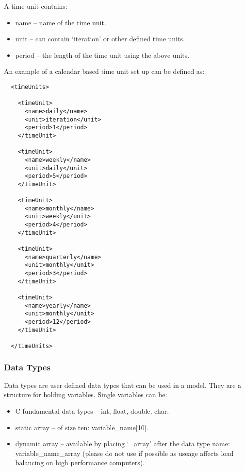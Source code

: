 A time unit contains:

\begin{itemize}
\item name -- name of the time unit.
\item unit -- can contain `iteration' or other defined time units.
\item period -- the length of the time unit using the above units.
\end{itemize}

An example of a calendar based time unit set up can be defined as:

\begin{verbatim}
  <timeUnits>
  
    <timeUnit>
      <name>daily</name>
      <unit>iteration</unit>
      <period>1</period>
    </timeUnit>
    
    <timeUnit>
      <name>weekly</name>
      <unit>daily</unit>
      <period>5</period>
    </timeUnit>
    
    <timeUnit>
      <name>monthly</name>
      <unit>weekly</unit>
      <period>4</period>
    </timeUnit>
    
    <timeUnit>
      <name>quarterly</name>
      <unit>monthly</unit>
      <period>3</period>
    </timeUnit>
    
    <timeUnit>
      <name>yearly</name>
      <unit>monthly</unit>
      <period>12</period>
    </timeUnit>
    
  </timeUnits>
\end{verbatim}

\clearpage

\subsubsection{Data Types}

Data types are user defined data types that can be used in a model. They are a
structure for holding variables. Single variables can be:

\begin{itemize}
  \item C fundamental data types -- int, float, double, char.
  \item static array -- of size ten: variable\_name[10].
  \item dynamic array -- available by placing `\_array' after
  the data type name: variable\_name\_array (please do not use if possible as
  useage affects load balancing on high performance computers).
\end{itemize}

